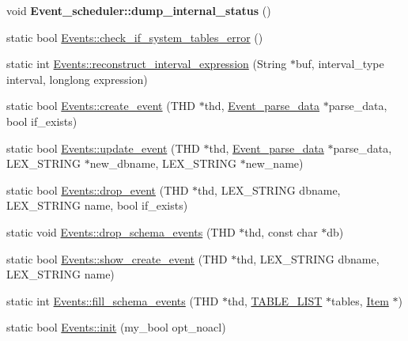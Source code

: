 \begin{DoxyCompactItemize}
void {\bfseries Event\+\_\+scheduler\+::dump\+\_\+internal\+\_\+status} ()
\item 
static bool \mbox{\hyperlink{group__Event__Scheduler_ga97efaefcec61d1bb9b7e0c518c1319ce}{Events\+::check\+\_\+if\+\_\+system\+\_\+tables\+\_\+error}} ()
\item 
static int \mbox{\hyperlink{group__Event__Scheduler_gafb6d2b26338cb92f01504ba32e0ecdf7}{Events\+::reconstruct\+\_\+interval\+\_\+expression}} (String $\ast$buf, interval\+\_\+type interval, longlong expression)
\item 
static bool \mbox{\hyperlink{group__Event__Scheduler_ga8fbb9616149b046c5cc59eb889d6f809}{Events\+::create\+\_\+event}} (T\+HD $\ast$thd, \mbox{\hyperlink{classEvent__parse__data}{Event\+\_\+parse\+\_\+data}} $\ast$parse\+\_\+data, bool if\+\_\+exists)
\item 
static bool \mbox{\hyperlink{group__Event__Scheduler_ga7577ede664831ea99e27f45a0d91d946}{Events\+::update\+\_\+event}} (T\+HD $\ast$thd, \mbox{\hyperlink{classEvent__parse__data}{Event\+\_\+parse\+\_\+data}} $\ast$parse\+\_\+data, L\+E\+X\+\_\+\+S\+T\+R\+I\+NG $\ast$new\+\_\+dbname, L\+E\+X\+\_\+\+S\+T\+R\+I\+NG $\ast$new\+\_\+name)
\item 
static bool \mbox{\hyperlink{group__Event__Scheduler_gac4837ceab76a62f91e99c63a718e7da9}{Events\+::drop\+\_\+event}} (T\+HD $\ast$thd, L\+E\+X\+\_\+\+S\+T\+R\+I\+NG dbname, L\+E\+X\+\_\+\+S\+T\+R\+I\+NG name, bool if\+\_\+exists)
\item 
static void \mbox{\hyperlink{group__Event__Scheduler_ga3a0f2bbcd465f2afe81b3f88fb2bf62e}{Events\+::drop\+\_\+schema\+\_\+events}} (T\+HD $\ast$thd, const char $\ast$db)
\item 
static bool \mbox{\hyperlink{group__Event__Scheduler_ga99ad9b87a2e1ce1b69c8f9c31e4ee5d1}{Events\+::show\+\_\+create\+\_\+event}} (T\+HD $\ast$thd, L\+E\+X\+\_\+\+S\+T\+R\+I\+NG dbname, L\+E\+X\+\_\+\+S\+T\+R\+I\+NG name)
\item 
static int \mbox{\hyperlink{group__Event__Scheduler_gae80cc405efbd8816c70a163818854645}{Events\+::fill\+\_\+schema\+\_\+events}} (T\+HD $\ast$thd, \mbox{\hyperlink{structTABLE__LIST}{T\+A\+B\+L\+E\+\_\+\+L\+I\+ST}} $\ast$tables, \mbox{\hyperlink{classItem}{Item}} $\ast$)
\item 
static bool \mbox{\hyperlink{group__Event__Scheduler_gaa1df78d5847482dc1712c780dfd44b9a}{Events\+::init}} (my\+\_\+bool opt\+\_\+noacl)
\item 
\mbox{\label{group__Event__Scheduler_ga72f109679a0c7de4b033e3dee13437bf}} 

\end{DoxyCompactItemize}
